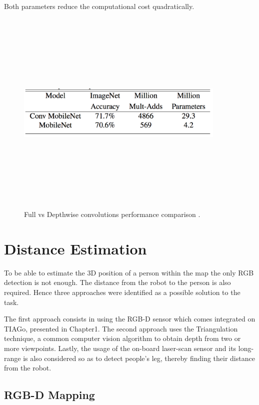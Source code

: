 Both parameters reduce the computational cost quadratically.

\begin{figure}[!htbp]
\begin{center}
\includegraphics[width=10cm,height=10cm,keepaspectratio]{images/mobileNet_table.png}
\end{center}
\caption{Full vs Depthwise convolutions performance comparison \cite{paper:MobileNets}.}
\end{figure}

\section{Distance Estimation}

To be able to estimate the 3D position of a person within the map the only RGB detection is not enough. The distance from the robot to the person is also required. Hence three approaches were identified as a possible solution to the task.

The first approach consists in using the RGB-D sensor which comes integrated on TIAGo, presented in Chapter1. The second approach uses the Triangulation technique, a common computer vision algorithm to obtain depth from two or more viewpoints. Lastly, the usage of the on-board laser-scan sensor and its long-range is also considered so as to detect people's leg, thereby finding their distance from the robot.

\subsection{RGB-D Mapping}

